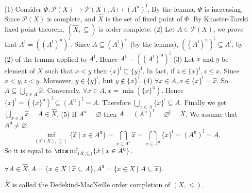 \begin{proofenv}
    \quad
    \newline
    (1) Consider $\Phi :\mathscr{P}(X)\rightarrow\mathscr{P}(X), A\mapsto(A^\mathrm{u})^\mathrm{l}$. By the lemma,  $\Phi $  is increasing. Since $\mathscr{P}(X)$ is complete, and $\hat{X}$ is the set of fixed point of $\Phi$. By Knaster-Tarski fixed point theorem, $(\hat{X}, \subseteq)$ is order complete.
    \newline
    (2) Let $A\in \mathscr{P}(X)$,  we prove that $A^\mathrm{l}=((A^\mathrm{l})^\mathrm{u})^\mathrm{l}$. Since $A\subseteq (A^\mathrm{l})^\mathrm{u}$ (by the lemma),  $((A^\mathrm{l})^\mathrm{u})^\mathrm{l}\subseteq A^\mathrm{l}$,  by (2) of the lemma applied to $A^\mathrm{l}$. Hence $A^\mathrm{l}=((A^\mathrm{l})^\mathrm{u})^\mathrm{l}$
    \newline
    (3) Let $x$ and $y$ be element of $X$ such that $x< y$ then $\{x\}^\mathrm{l}\subseteq\{y\}^\mathrm{l}$. In fact,  if $z\in \{x\}^\mathrm{l}, z\le x$. Since $x<y, z<y$. Moreover,  $y\in \{y\}^\mathrm{l}$,  but $y\notin \{x\}^\mathrm{l}$.
    \newline
    (4) $\forall x \in A, x\in \{x\}^\mathrm{l}=\hat{x}$. So $A\subseteq\bigcup_{x\in A}\hat{x}$.
    Conversely,  $\forall x\in A,  x=\min (\{x\}^\mathrm{u})$. Hence $\{x\}^\mathrm{l}=(\{x\}^\mathrm{u})^\mathrm{l}\subseteq (A^\mathrm{u})^\mathrm{l}=A$. Therefore $\bigcup_{x\in A}\{x\}^\mathrm{l}\subseteq A$. Finally we get $\bigcup_{x\in A}\hat{x}=A\in \hat{X}$.
    \newline
    (5) If $A^\mathrm{u}=\varnothing$ then $A=(A^\mathrm{u})^\mathrm{l}=\varnothing^\mathrm{l}=X$. We assume that $A^\mathrm{u}\not=\varnothing$.
    $$\inf _{(\mathscr{P}(X), \subseteq)}\{\hat{x}\mid x\in A^\mathrm{u}\}=\bigcap_{x\in A^\mathrm{u}}\hat{x}=\bigcap_{x\in A^\mathrm{u}}\{x\}^\mathrm{l}=(A^\mathrm{u})^\mathrm{l}=A.$$
    So it is equal to $\dis\inf_{(\hat{X}, \subseteq)}\{\hat{x}\mid x\in A ^\mathrm{u}\}$.
\end{proofenv}
\begin{remark}
    $\forall A\in \hat{X}, A=\{x\in X\mid \hat{x}\subseteq A\}, A^\mathrm{u}=\{x\in X\mid A\subseteq \hat{x}\}$.
\end{remark}
\begin{definitionenv}
    $\hat{X}$ is called the Dedekind-MacNeille order completion of $(X, \le)$.
\end{definitionenv}
